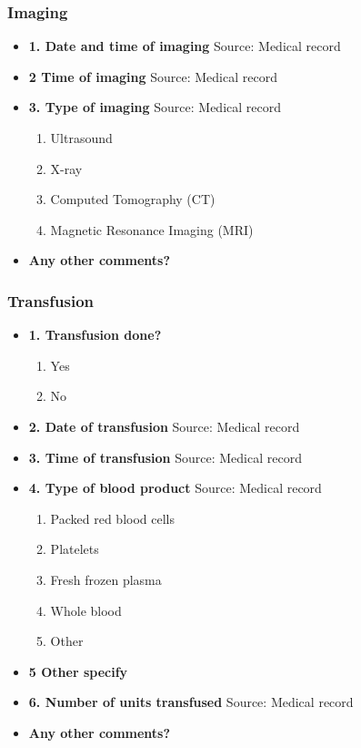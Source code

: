 \documentclass[
]{scrartcl}
\providecommand{\tightlist}{%
  \setlength{\itemsep}{0pt}\setlength{\parskip}{0pt}}\usepackage{longtable,booktabs,array}
\begin{document}
\hypertarget{imaging}{%
\subsubsection{Imaging}\label{imaging}}

\begin{itemize}
\item
  \textbf{1. Date and time of imaging} Source: Medical record
\item
  \textbf{2 Time of imaging} Source: Medical record
\item
  \textbf{3. Type of imaging} Source: Medical record

  \begin{enumerate}
  \def\labelenumi{\arabic{enumi}.}
  \tightlist
  \item
    Ultrasound
  \item
    X-ray
  \item
    Computed Tomography (CT)
  \item
    Magnetic Resonance Imaging (MRI)
  \end{enumerate}
\item
  \textbf{Any other comments?}
\end{itemize}

\hypertarget{transfusion}{%
\subsubsection{Transfusion}\label{transfusion}}

\begin{itemize}
\item
  \textbf{1. Transfusion done?}

  \begin{enumerate}
  \def\labelenumi{\arabic{enumi}.}
  \tightlist
  \item
    Yes
  \item
    No
  \end{enumerate}
\item
  \textbf{2. Date of transfusion} Source: Medical record
\item
  \textbf{3. Time of transfusion} Source: Medical record
\item
  \textbf{4. Type of blood product} Source: Medical record

  \begin{enumerate}
  \def\labelenumi{\arabic{enumi}.}
  \tightlist
  \item
    Packed red blood cells
  \item
    Platelets
  \item
    Fresh frozen plasma
  \item
    Whole blood
  \item
    Other
  \end{enumerate}
\item
  \textbf{5 Other specify}
\item
  \textbf{6. Number of units transfused} Source: Medical record
\item
  \textbf{Any other comments?}
\end{itemize}
\end{document}
